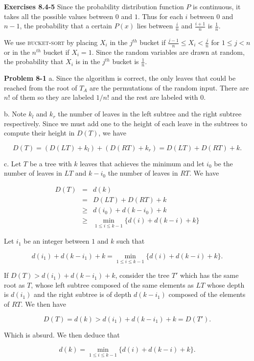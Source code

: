 \documentclass[a4paper,12pt]{article}
\newcommand{\newpar}[1]
{\bigskip \noindent \textbf{Exercises #1} \newline}
\newcommand{\newprob}[1]
{\bigskip \noindent \textbf{Problem #1} \newline}
\newcommand{\subpar}[1]{\medskip \noindent #1.}
\begin{document}
\newpar{8.4-5} Since the probability distribution function $P$ is
continuous, it takes all the possible values between $0$ and $1$.  Thus
for each $i$ between $0$ and $n-1$, the probability that a certain
$P(x)$ lies between $\frac{i}{n}$ and $\frac{i+1}{n}$ is
$\frac{1}{n}$.

We use \textsc{bucket-sort} by placing $X_i$ in the $j^{th}$ bucket if
$\frac{j-1}{n}\le X_i<\frac{j}{n}$ for $1\le j < n$ or in the $n^{th}$
bucket if $X_i = 1$.  Since the random variables are drawn at random,
the probability that $X_i$ is in the $j^{th}$ bucket is $\frac{1}{n}$.

\newprob{8-1} \subpar{a} Since the algorithm is correct, the only
leaves that could be reached from the root of $T_A$ are the
permutations of the random input.  There are $n!$ of them so they are
labeled $1/n!$ and the rest are labeled with $0$.

\subpar{b} Note $k_l$ and $k_r$ the number of leaves in the left
subtree and the right subtree respectively.  Since we must add one to
the height of each leave in the subtrees to compute their height in
$D(T)$, we have

\[ D(T) = (D(LT) + k_l) + (D(RT) + k_r) = D(LT) + D(RT) + k.\]

\subpar{c} Let $T$ be a tree with $k$ leaves that achieves the minimum
and let $i_0$ be the number of leaves in $LT$ and $k-i_0$ the number
of leaves in $RT$.  We have

\begin{eqnarray*}
  D(T) &=& d(k) \\
  &=& D(LT) + D(RT) + k \\
  &\ge& d(i_0) + d(k-i_0) + k \\
  &\ge& \min_{1\le i\le k-1}\{d(i) + d(k-i) +k\}
\end{eqnarray*}

Let $i_1$ be an integer between $1$ and $k$ such that

\[ d(i_1) + d(k-i_1) + k = \min_{1\le i\le k-1}\{d(i) + d(k-i) +k\}.\]

If $D(T) > d(i_1) + d(k-i_1) + k$, consider the tree $T'$ which has
the same root as $T$, whose left subtree composed of the same elements
as $LT$ whose depth is $d(i_1)$ and the right subtree is of depth
$d(k-i_1)$ composed of the elements of $RT$.  We then have

\[ D(T) = d(k) > d(i_1) + d(k-i_1) + k = D(T').\]

Which is absurd.  We then deduce that

\[ d(k) = \min_{1\le i\le k-1}\{d(i) + d(k-i) + k\}.\]
\end{document}

